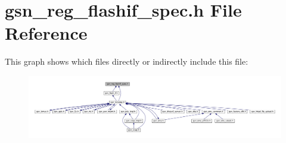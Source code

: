 \hypertarget{a00552}{
\section{gsn\_\-reg\_\-flashif\_\-spec.h File Reference}
\label{a00552}
}
This graph shows which files directly or indirectly include this file:
\nopagebreak
\begin{figure}[H]
\begin{center}
\leavevmode
\includegraphics[width=400pt]{a00788}
\end{center}
\end{figure}
